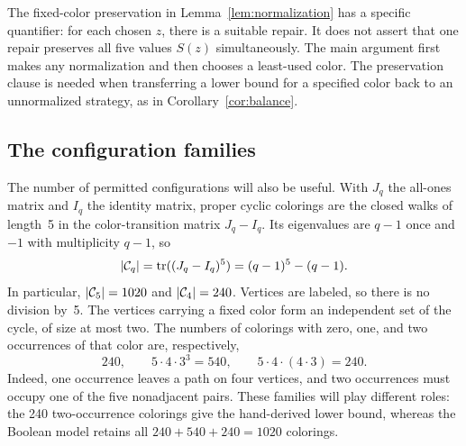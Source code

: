 The fixed-color preservation in Lemma~\ref{lem:normalization} has a
specific quantifier: for each chosen $z$, there is a suitable repair.
It does not assert that one repair preserves all five values $S(z)$
simultaneously. The main argument first makes any normalization and then
chooses a least-used color. The preservation clause is needed when
transferring a lower bound for a specified color back to an unnormalized
strategy, as in Corollary~\ref{cor:balance}.

\subsection{The configuration families}
The number of permitted configurations will also be useful. With $J_q$
the all-ones matrix and $I_q$ the identity matrix, proper cyclic colorings
are the closed walks of length~5 in the color-transition matrix $J_q-I_q$.
Its eigenvalues are $q-1$ once and $-1$ with multiplicity $q-1$, so
\begin{equation}\label{eq:configuration-count}
|\mathcal{C}_q|=\operatorname{tr}((J_q-I_q)^5)=(q-1)^5-(q-1).
\end{equation}
In particular, $|\mathcal{C}_5|=1020$ and $|\mathcal{C}_4|=240$. Vertices are labeled,
so there is no division by~5. The vertices carrying a fixed color form an
independent set of the cycle, of size at most two. The numbers of colorings
with zero, one, and two occurrences of that color are, respectively,
\begin{equation}\label{eq:layers}
240,\qquad 5\cdot4\cdot3^3=540,\qquad5\cdot4\cdot(4\cdot3)=240.
\end{equation}
Indeed, one occurrence leaves a path on four vertices, and two occurrences
must occupy one of the five nonadjacent pairs.
These families will play different roles: the 240 two-occurrence colorings
give the hand-derived lower bound, whereas the Boolean model retains all
$240+540+240=1020$ colorings.

